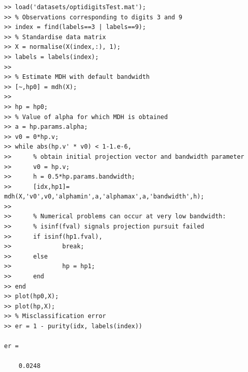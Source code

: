 \documentclass{book}
\begin{document}
\begin{verbatim}
>> load('datasets/optidigitsTest.mat');
>> % Observations corresponding to digits 3 and 9
>> index = find(labels==3 | labels==9);
>> % Standardise data matrix
>> X = normalise(X(index,:), 1);
>> labels = labels(index);
>> 
>> % Estimate MDH with default bandwidth
>> [~,hp0] = mdh(X);
>> 
>> hp = hp0;
>> % Value of alpha for which MDH is obtained
>> a = hp.params.alpha;
>> v0 = 0*hp.v;
>> while abs(hp.v' * v0) < 1-1.e-6,
>>      % obtain initial projection vector and bandwidth parameter
>>      v0 = hp.v;
>>      h = 0.5*hp.params.bandwidth;
>>      [idx,hp1]= mdh(X,'v0',v0,'alphamin',a,'alphamax',a,'bandwidth',h);
>>
>>      % Numerical problems can occur at very low bandwidth:
>>      % isinf(fval) signals projection pursuit failed 
>>      if isinf(hp1.fval),
>>              break;
>>      else
>>              hp = hp1;
>>      end
>> end
>> plot(hp0,X);
>> plot(hp,X);
>> % Misclassification error
>> er = 1 - purity(idx, labels(index))

er =

    0.0248

\end{verbatim}
\end{document}
